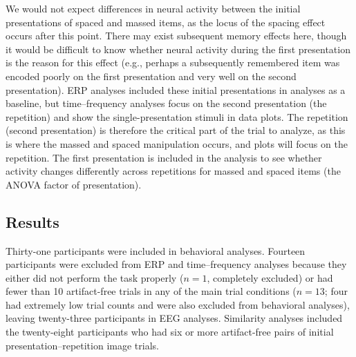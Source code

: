 We would not expect differences in neural activity between the initial presentations of spaced and massed items, as the locus of the spacing effect occurs after this point.
There may exist subsequent memory effects here, though it would be difficult to know whether neural activity during the first presentation is the reason for this effect (e.g., perhaps a subsequently remembered item was encoded poorly on the first presentation and very well on the second presentation).  ERP analyses included these initial presentations in analyses as a baseline, but time--frequency analyses focus on the second presentation (the repetition) and show the single-presentation stimuli in data plots.
\cbstart
The repetition (second presentation) is therefore the critical part of the trial to analyze, as this is where the massed and spaced manipulation occurs, and plots will focus on the repetition.  The first presentation is included in the analysis to see whether activity changes differently across repetitions for massed and spaced items (the ANOVA factor of presentation).
\cbend






\subsection{Results}




Thirty-one participants were included in behavioral analyses.  Fourteen participants were excluded from ERP and time--frequency analyses because they either did not perform the task properly ($n=1$, completely excluded) or had fewer than 10 artifact-free trials in any of the main trial conditions ($n=13$; four had extremely low trial counts and were also excluded from behavioral analyses),
leaving twenty-three participants in EEG analyses.  Similarity analyses included the twenty-eight participants who had six or more artifact-free pairs of initial presentation--repetition image trials.

